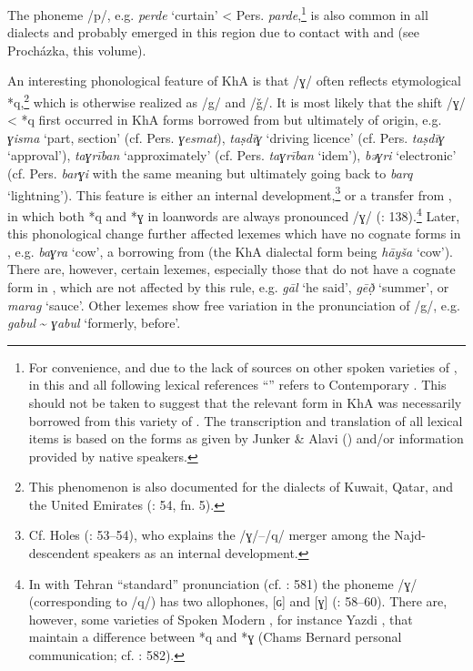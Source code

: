 \documentclass[output=paper,nonflat]{langsci/langscibook}
\begin{document}
The {phoneme} /p/, e.g. \textit{perde} ‘curtain’ < Pers. \textit{parde},\footnote{For convenience, and due to the lack of sources on other spoken varieties of , in this and all following lexical references ``'' refers to Contemporary  . This should not be taken to suggest that the relevant form in KhA was necessarily borrowed from this variety of . The transcription and translation of all  lexical items is based on the forms as given by Junker \& Alavi (\citeyear{JunkerAlavi2002}) and/or information provided by native speakers.} is also common in all  dialects and probably emerged in this region due to contact with  and  (see Procházka, this volume). 

An interesting phonological feature of KhA is that /ɣ/ often reflects etymological *q,\footnote{This phenomenon is also documented for the  dialects of Kuwait, Qatar, and the United  Emirates (\citealt{Holes2016}: 54, fn. 5).} which is otherwise realized as /g/ and /ǧ/. It is most likely that the shift /ɣ/ < *q first occurred in KhA forms borrowed from  but ultimately of  origin, e.g. \textit{ɣisma} ‘part, section’ (cf. Pers. \textit{ɣesmat}), \textit{taṣdīɣ} ‘driving licence’ (cf. Pers. \textit{taṣdīɣ} `approval'), \textit{taɣrīban} ‘approximately’ (cf. Pers. \textit{taɣrīban} `idem'), \textit{bəɣri} ‘electronic’ (cf. Pers. \textit{barɣi} with the same meaning but ultimately going back to  \textit{barq} ‘lightning’). This feature is either an internal development,\footnote{Cf. Holes (\citeyear{Holes2016}: 53–54), who explains the /ɣ/–/q/ {merger} among the Najd-descendent   speakers as an internal development.} or a {transfer} from , in which both *q and *ɣ in  {loanwords} are always pronounced /ɣ/ (\citealt{MatrasShabibi2007}: 138).\footnote{In   with Tehran ``standard'' pronunciation (cf. \citealt{Paul2018}: 581) the {phoneme} /ɣ/ (corresponding to  /q/) has two allophones, [ɢ] and [ɣ] (\citealt{Majidi1986}: 58–60). There are, however, some varieties of Spoken Modern , for instance Yazdi , that maintain a difference between *q and *ɣ (Chams Bernard  personal communication; cf. \citealt{Paul2018}: 582).} Later, this phonological change further affected lexemes which have no {cognate} forms in , e.g. \textit{baɣra} `cow', a borrowing from   (the KhA dialectal form being \textit{hāyša} `cow'). There are, however, certain lexemes, especially those that do not have a {cognate} form in , which are not affected by this rule, e.g. \textit{gāl} `he said', \textit{gēð̣} ‘summer’, or \textit{marag} ‘sauce’. Other lexemes show free variation in the pronunciation of /g/, e.g. \textit{gabul} \~{} \textit{ɣabul} `formerly, before'.
\end{document}

